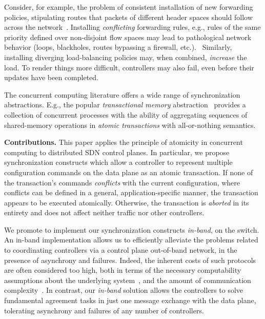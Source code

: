 \documentclass[conference]{sigcomm-alternate}
\begin{document}
Consider, for example, the problem of
consistent installation of new forwarding policies, stipulating routes
that packets of different header spaces should follow across the
network~\cite{network-update,roger-hotnets,podc15}.
Installing \emph{conflicting} forwarding rules, e.g., rules of the same priority defined over non-disjoint
flow spaces may lead to pathological network behavior (loops,
blackholes, routes bypassing a firewall, etc.).~\cite{hotnets14update,roger-hotnets}
Similarly, installing diverging load-balancing policies may,
when combined, \emph{increase} the load.
To render things more difficult, controllers may also fail,
even before their updates have been completed.

The concurrent computing literature offers
a wide range of synchronization abstractions.
E.g., the popular \emph{transactional
  memory} abstraction~\cite{tm-book} provides a collection of
concurrent processes with the ability of aggregating sequences of
shared-memory operations in \emph{atomic  transactions} with
all-or-nothing semantics.


\vspace{1mm}
\noindent\textbf{Contributions.}
This paper applies the principle of atomicity in concurrent computing
to distributed SDN control planes.
%
In particular, we propose synchronization constructs which
allow a controller to represent multiple configuration commands on
the data plane as an atomic transaction.
%
If none of the transaction's commands \emph{conflicts}  with the current
configuration, where conflicts can be
defined in a general, application-specific manner, the transaction appears to be executed atomically.
Otherwise, the transaction is \emph{aborted} in its entirety and does not
affect neither traffic nor other controllers.

We promote to implement our synchronization constructs \emph{in-band},
on the switch.
An in-band implementation allows us to efficiently alleviate the problems related to
coordinating controllers via a control plane
out-of-band network, in the presence of asynchrony and failures.
Indeed, the inherent costs  of such protocols are often considered too high, both in
terms of the necessary computability assumptions about the underlying
system~\cite{FLP85}, and the amount of communication
complexity~\cite{Lam06}.
In contrast, our \emph{in-band} solution allows the
controllers to solve fundamental agreement tasks in just one message
exchange with the data plane, tolerating asynchrony and failures of
any number of controllers.
\end{document}

